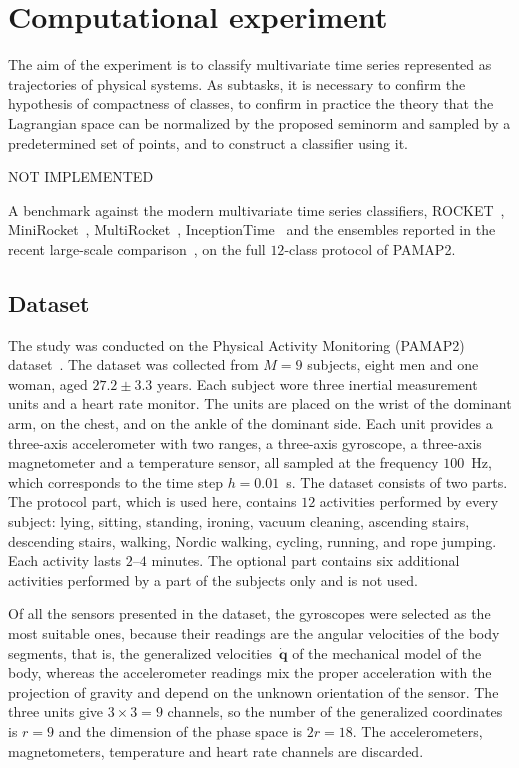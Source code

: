 \documentclass[sn-mathphys-num]{sn-jnl}
\theoremstyle{thmstylethree}
\theoremstyle{thmstyletwo}
\theoremstyle{thmstyleone}
\begin{document}
\section{Computational experiment} \label{sec:experiment}
The aim of the experiment is to classify multivariate time series represented as trajectories
of physical systems. As subtasks, it is necessary to confirm the hypothesis of compactness of
classes, to confirm in practice the theory that the Lagrangian space can be normalized by the
proposed seminorm and sampled by a predetermined set of points, and to construct a classifier using
it.

NOT IMPLEMENTED

A benchmark against the modern multivariate time series classifiers, ROCKET~\cite{ROCKET}, MiniRocket~\cite{MiniRocket}, MultiRocket~\cite{MultiRocket},
InceptionTime~\cite{InceptionTime} and the ensembles reported in the recent large-scale comparison~\cite{BakeOffRedux}, on the full $12$-class protocol of PAMAP2.
\subsection{Dataset} \label{sec:dataset}
The study was conducted on the Physical Activity Monitoring (PAMAP2) dataset~\cite{misc_pamap2_physical_activity_monitoring_231}. The dataset was collected from $M = 9$ subjects, eight men and one woman, aged $27.2 \pm 3.3$ years. Each subject wore three inertial measurement units and a heart rate monitor. The units are placed on the wrist of the dominant arm, on the chest, and on the ankle of the dominant side. Each unit provides a three-axis accelerometer with two ranges, a three-axis gyroscope, a three-axis magnetometer and a temperature sensor, all sampled at the frequency $100$~Hz, which corresponds to the time step $h = 0.01$~s. The dataset consists of two parts. The protocol part, which is used here, contains $12$ activities performed by every subject: lying, sitting, standing, ironing, vacuum cleaning, ascending stairs, descending stairs, walking, Nordic walking, cycling, running, and rope jumping. Each activity lasts $2$--$4$ minutes. The optional part contains six additional activities performed by a part of the subjects only and is not used.

Of all the sensors presented in the dataset, the gyroscopes were selected as the most suitable ones, because their readings are the angular velocities of the body segments, that is, the generalized velocities~$\dot{\mathbf{q}}$ of the mechanical model of the body, whereas the accelerometer readings mix the proper acceleration with the projection of gravity and depend on the unknown orientation of the sensor. The three units give $3 \times 3 = 9$ channels, so the number of the generalized coordinates is $r = 9$ and the dimension of the phase space is $2r = 18$. The accelerometers, magnetometers, temperature and heart rate channels are discarded.
\end{document}
